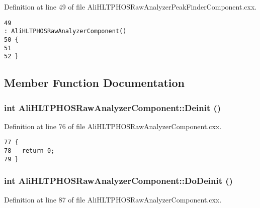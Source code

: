 Definition at line 49 of file Ali\-HLTPHOSRaw\-Analyzer\-Peak\-Finder\-Component.cxx.

\footnotesize\begin{verbatim}49                                                                                                                                     : AliHLTPHOSRawAnalyzerComponent()
50 {
51 
52 }
\end{verbatim}\normalsize 




\subsection{Member Function Documentation}
\subsubsection{\setlength{\rightskip}{0pt plus 5cm}int Ali\-HLTPHOSRaw\-Analyzer\-Component::Deinit ()\hspace{0.3cm}{\tt  [virtual, inherited]}}\label{classAliHLTPHOSRawAnalyzerComponent_AliHLTPHOSRawAnalyzerPeakFinderComponenta5}




Definition at line 76 of file Ali\-HLTPHOSRaw\-Analyzer\-Component.cxx.

\footnotesize\begin{verbatim}77 {
78   return 0;
79 }
\end{verbatim}\normalsize 


\subsubsection{\setlength{\rightskip}{0pt plus 5cm}int Ali\-HLTPHOSRaw\-Analyzer\-Component::Do\-Deinit ()\hspace{0.3cm}{\tt  [virtual, inherited]}}\label{classAliHLTPHOSRawAnalyzerComponent_AliHLTPHOSRawAnalyzerPeakFinderComponenta6}




Definition at line 87 of file Ali\-HLTPHOSRaw\-Analyzer\-Component.cxx.

